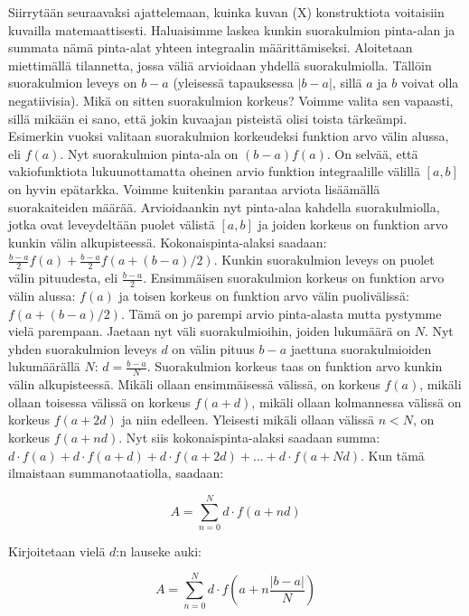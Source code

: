 \documentclass[../integrointiopas.tex]{subfiles}
\begin{document}
    Siirrytään seuraavaksi ajattelemaan, kuinka kuvan (X) konstruktiota voitaisiin kuvailla matemaattisesti. Haluaisimme laskea kunkin suorakulmion pinta-alan ja summata
    nämä pinta-alat yhteen integraalin määrittämiseksi. Aloitetaan miettimällä tilannetta, jossa väliä arvioidaan yhdellä suorakulmiolla. Tällöin suorakulmion leveys on
    $b-a$ (yleisessä tapauksessa $|b-a|$, sillä $a$ ja $b$ voivat olla negatiivisia). Mikä on sitten suorakulmion korkeus? Voimme valita sen vapaasti, sillä mikään ei
    sano, että jokin kuvaajan pisteistä olisi toista tärkeämpi. Esimerkin vuoksi valitaan suorakulmion korkeudeksi funktion arvo välin alussa, eli $f(a)$. Nyt suorakulmion
    pinta-ala on $(b-a)f(a)$. On selvää, että vakiofunktiota lukuunottamatta oheinen arvio funktion integraalille välillä $[a,b]$ on hyvin epätarkka. Voimme kuitenkin parantaa
    arviota lisäämällä suorakaiteiden määrää. Arvioidaankin nyt pinta-alaa kahdella suorakulmiolla, jotka ovat leveydeltään puolet välistä $[a,b]$ ja joiden korkeus on funktion
    arvo kunkin välin alkupisteessä. Kokonaispinta-alaksi saadaan: $\frac{b-a}{2}f(a) + \frac{b-a}{2}f(a+(b-a)/2)$. Kunkin suorakulmion leveys on puolet välin pituudesta, eli
    $\frac{b-a}{2}$. Ensimmäisen suorakulmion korkeus on funktion arvo välin alussa: $f(a)$ ja toisen korkeus on funktion arvo välin puolivälissä: $f(a+(b-a)/2)$. Tämä on jo
    parempi arvio pinta-alasta mutta pystymme vielä parempaan. Jaetaan nyt väli suorakulmioihin, joiden lukumäärä on $N$. Nyt yhden suorakulmion leveys $d$ on välin pituus $b-a$ jaettuna
    suorakulmioiden lukumäärällä $N$: $d = \frac{b - a}{N}$. Suorakulmion korkeus taas on funktion arvo kunkin välin alkupisteessä. Mikäli ollaan ensimmäisessä välissä, on korkeus $f(a)$,
    mikäli ollaan toisessa välissä on korkeus $f(a + d)$, mikäli ollaan kolmannessa välissä on korkeus $f(a + 2d)$ ja niin edelleen. Yleisesti mikäli ollaan välissä $n < N$, on korkeus $f(a + nd)$.
    Nyt siis kokonaispinta-alaksi saadaan summa: $d\cdot f(a) + d\cdot f(a + d) + d\cdot f(a + 2d) + \dots + d \cdot f(a + Nd)$. Kun tämä ilmaistaan summanotaatiolla, saadaan:

    \begin{equation*}
        A = \sum_{n = 0}^{N}d\cdot f(a + nd)
    \end{equation*}

    Kirjoitetaan vielä $d$:n lauseke auki:

    \begin{equation*}
        A = \sum_{n = 0}^{N}d\cdot f\left( a + n\frac{|b - a|}{N} \right)
    \end{equation*}
\end{document}
